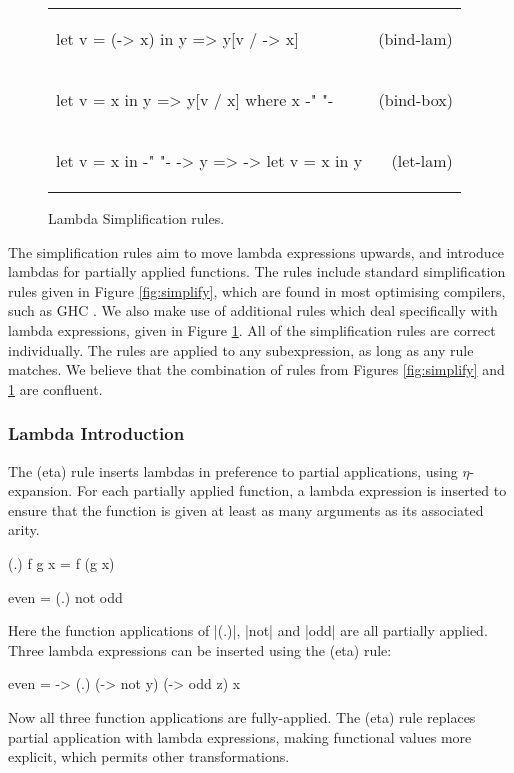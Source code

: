 \documentclass[preprint]{sigplanconf}
\newcommand{\simp}[2]{\begin{minipage}{6.4cm}#2\end{minipage} & (#1) \\}
\newenvironment{simplify}
    {\noindent
     \begin{flushright}
     \begin{tabular}{p{6.5cm}r}
    }
    {\end{tabular}
     \end{flushright}
    }
\begin{document}
\begin{figure}
\begin{simplify}

\simp{bind-lam}{
\ignore\begin{code}
let v = (\w -> x) in y
    => y[v / \w -> x]
\end{code}}

\simp{bind-box}{
\ignore\begin{code}
let v = x in y
    => y[v / x]
    where x {-" \text{ is a boxed lambda (see \S\ref{sec:inlining})} "-}
\end{code}}

\simp{let-lam}{
\ignore\begin{code}
let v = x in {-" "-} \w -> y
    => \w -> let v = x in y
\end{code}}

\end{simplify}
\caption{Lambda Simplification rules.}
\label{fig:lambda_simplify}
\end{figure}

The simplification rules aim to move lambda expressions upwards, and introduce lambdas for partially applied functions. The rules include standard simplification rules given in Figure \ref{fig:simplify}, which are found in most optimising compilers, such as GHC \cite{spj:transformation}. We also make use of additional rules which deal specifically with lambda expressions, given in Figure \ref{fig:lambda_simplify}. All of the simplification rules are correct individually. The rules are applied to any subexpression, as long as any rule matches. We believe that the combination of rules from Figures \ref{fig:simplify} and \ref{fig:lambda_simplify} are confluent.

\subsubsection{Lambda Introduction}

The (eta) rule inserts lambdas in preference to partial applications, using $\eta$-expansion. For each partially applied function, a lambda expression is inserted to ensure that the function is given at least as many arguments as its associated arity.

\begin{example}
\ignore\begin{code}
(.) f g x = f (g x)

even = (.) not odd
\end{code}

\noindent Here the function applications of |(.)|, |not| and |odd| are all partially applied. Three lambda expressions can be inserted using the (eta) rule:

\begin{code}
even = \x -> (.) (\y -> not y) (\z -> odd z) x
\end{code}

\noindent Now all three function applications are fully-applied. The (eta) rule replaces partial application with lambda expressions, making functional values more explicit, which permits other transformations.
\end{example}
\end{document}
